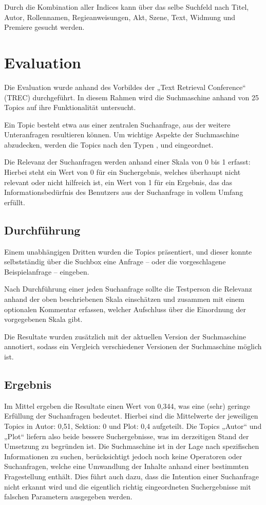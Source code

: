 Durch die Kombination aller Indices kann über das selbe Suchfeld nach
Titel, Autor, Rollennamen, Regieanweisungen, Akt, Szene,
Text, Widmung und Premiere gesucht werden.

\section{Evaluation}
Die Evaluation wurde anhand des Vorbildes der
„Text Retrieval Conference“ (TREC) durchgeführt.
In diesem Rahmen wird die Suchmaschine anhand von 25 Topics
auf ihre Funktionalität untersucht.

Ein Topic besteht etwa aus einer zentralen Suchanfrage,
aus der weitere Unteranfragen resultieren können.
Um wichtige Aspekte der Suchmaschine abzudecken,
werden die Topics nach den Typen ,
 und  eingeordnet.

Die Relevanz der Suchanfragen werden anhand einer Skala von 0 bis 1 erfasst:
Hierbei steht ein Wert von 0 für ein Suchergebnis,
welches überhaupt nicht relevant oder nicht hilfreich ist,
ein Wert von 1 für ein Ergebnis, das das Informationsbedürfnis des Benutzers
aus der Suchanfrage in vollem Umfang erfüllt.

\subsection{Durchführung}

Einem unabhängigen Dritten wurden die Topics präsentiert,
und dieser konnte selbstständig über die Suchbox
eine Anfrage -- oder die vorgeschlagene Beispielanfrage -- eingeben.

Nach Durchführung einer jeden Suchanfrage sollte die Testperson
die Relevanz anhand der oben beschriebenen Skala einschätzen
und zusammen mit einem optionalen Kommentar erfassen,
welcher Aufschluss über die Einordnung der vorgegebenen Skala gibt.

Die Resultate wurden zusätzlich
mit der aktuellen Version der Suchmaschine annotiert,
sodass ein Vergleich verschiedener Versionen der Suchmaschine möglich ist.

\subsection{Ergebnis}

Im Mittel ergeben die Resultate einen Wert von 0,344, was eine (sehr) geringe Erfüllung der Suchanfragen bedeutet. Hierbei sind die Mittelwerte der jeweiligen Topics in Autor: 0,51, Sektion: 0 und Plot: 0,4 aufgeteilt. Die Topics „Autor“ und „Plot“ liefern also beide bessere Suchergebnisse, was im derzeitigen Stand der Umsetzung zu begründen ist. Die Suchmaschine ist in der Lage nach spezifischen Informationen zu suchen, berücksichtigt jedoch noch keine Operatoren oder Suchanfragen, welche eine Umwandlung der Inhalte anhand einer bestimmten Fragestellung enthält. Dies führt auch dazu, dass die Intention einer Suchanfrage nicht erkannt wird und die eigentlich richtig eingeordneten Suchergebnisse mit falschen Parametern ausgegeben werden.

